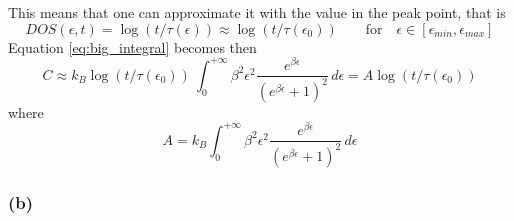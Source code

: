 \documentclass{article}
\begin{document}
This means that one can approximate it with the value in the peak point, that is
\begin{equation*}
    DOS(\epsilon, t) = \log(t/\tau(\epsilon)) \approx \log(t/\tau(\epsilon_0)) \qquad \text{for} \quad \epsilon \in [\epsilon_{min}, \epsilon_{max}]
\end{equation*}
Equation \ref{eq:big_integral} becomes then 
\begin{equation}
    C \approx k_B \log(t/\tau(\epsilon_0)) \ \int_0^{+\infty} \beta^2\epsilon^2 \frac{e^{\beta\epsilon}}{(e^{\beta\epsilon}+1)^2} \, d\epsilon =
    A \log(t/\tau(\epsilon_0))
\end{equation}
where 
\begin{equation*}
    A = k_B \int_0^{+\infty} \beta^2\epsilon^2 \frac{e^{\beta\epsilon}}{(e^{\beta\epsilon}+1)^2} \, d\epsilon
\end{equation*}

\subsubsection*{(b)}
\end{document}
